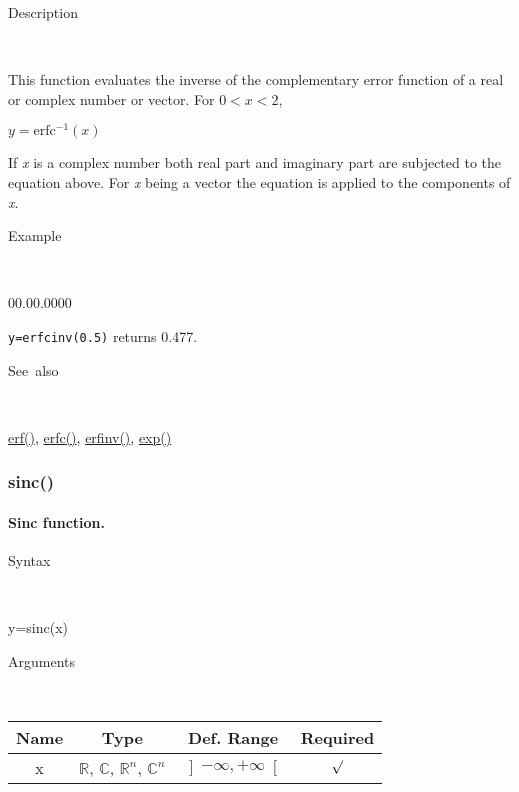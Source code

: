 \begin{description}
\item [Description]~
\end{description}
This function evaluates the inverse of the complementary error function
of a real or complex number or vector. For $0<x<2$,

\medskip{}
$y=\mathit{\mathrm{erfc^{-1}}}(x)$
\medskip{}

\noindent If \textit{x} is a complex number both real part and imaginary
part are subjected to the equation above. For \textit{x} being a vector
the equation is applied to the components of \textit{x}.

\begin{description}
\item [Example]~
\end{description}
\begin{lyxlist}{00.00.0000}
\item [\texttt{y=erfcinv(0.5)}]returns 0.477.
\end{lyxlist}
\begin{description}
\item [See~also]~
\end{description}
\textcolor{blue}{\hyperlink{erf}{erf()}}\textcolor{black}{,} \textcolor{blue}{\hyperlink{erfc}{erfc()}}\textcolor{black}{,}
\textcolor{blue}{\hyperlink{erfinv}{erfinv()}}\textcolor{black}{,}
\textcolor{blue}{\hyperlink{exp}{exp()}}


\newpage
\subsubsection*{\hypertarget{sinc}{}{\Large sinc()}}


\paragraph{\label{par:Sinc-function}Sinc function.}

\begin{description}
\item [Syntax]~
\end{description}
y=sinc(x)

\begin{description}
\item [Arguments]~
\end{description}
\begin{tabular}{|c|c|c|c|}
\hline 
Name&
Type&
Def. Range&
Required\tabularnewline
\hline
\hline 
x&
$\mathbb{R}$, $\mathbb{C}$, $\mathbb{R}^{n}$, $\mathbb{C}^{n}$&
$\left]-\infty,+\infty\right[$&
$\surd$\tabularnewline
\hline
\end{tabular}

